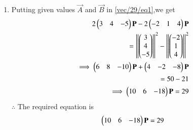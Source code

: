 \begin{enumerate}
\begin{itemize}
\end{itemize}
\item Putting given values $\vec{A}$ and $\vec{B}$ in \eqref{vec/29/eq1},we get 
\begin{align}
2\begin{pmatrix}3 & 4 & -5\end{pmatrix}\mathbf{P}-2\begin{pmatrix}-2 & 1 & 4\end{pmatrix}\mathbf{P}
\\
=\left\lVert\begin{pmatrix}3\\4\\-5\end{pmatrix}\right\rVert^2-\left\lVert\begin{pmatrix}-2\\1\\4\end{pmatrix}\right\rVert^2
\\
\implies\begin{pmatrix}6 & 8 & -10\end{pmatrix}\mathbf{P}+\begin{pmatrix}4 & -2 & -8\end{pmatrix}\mathbf{P} 
\\
=50-21
\\
\implies\begin{pmatrix}10 & 6 & -18\end{pmatrix}\mathbf{P}=29
\end{align}
$\therefore$ The required equation is
\begin{align}
\begin{pmatrix}10 & 6 & -18\end{pmatrix}\mathbf{P}=29
\end{align}
\end{enumerate}



